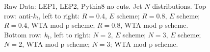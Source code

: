 \begin{figure}[H]
\hfill
{}\hfill
{}\hfill
\caption{Raw Data: LEP1, LEP2, Pythia8 no cuts. Jet $N$ distributions. Top row: anti-$k_t$, left to right: $R=0.4$, $E$ scheme; $R=0.8$, $E$ scheme; $R=0.4$, WTA mod p scheme; $R=0.8$, WTA mod p scheme. Bottom row: $k_t$, left to right: $N=2$, $E$ scheme; $N=3$, $E$ scheme; $N=2$, WTA mod p scheme; $N=3$; WTA mod p scheme.}  
\end{figure} 

